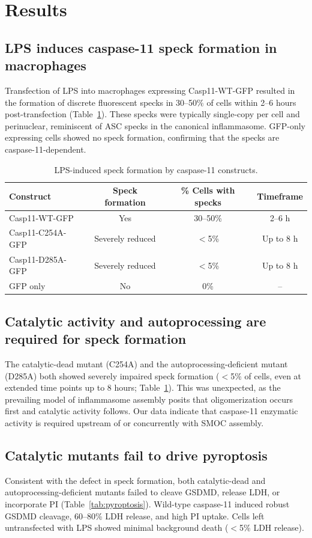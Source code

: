 \documentclass[11pt]{article}
\begin{document}
\section{Results}

\subsection{LPS induces caspase-11 speck formation in macrophages}
Transfection of LPS into macrophages expressing Casp11-WT-GFP resulted in the formation of discrete fluorescent specks in 30--50\% of cells within 2--6 hours post-transfection (Table~\ref{tab:specks}). These specks were typically single-copy per cell and perinuclear, reminiscent of ASC specks in the canonical inflammasome. GFP-only expressing cells showed no speck formation, confirming that the specks are caspase-11-dependent.

\begin{table}[h]
\centering
\caption{LPS-induced speck formation by caspase-11 constructs.}
\label{tab:specks}
\begin{tabular}{lccc}
\toprule
Construct & Speck formation & \% Cells with specks & Timeframe \\
\midrule
Casp11-WT-GFP & Yes & 30--50\% & 2--6 h \\
Casp11-C254A-GFP & Severely reduced & $<$5\% & Up to 8 h \\
Casp11-D285A-GFP & Severely reduced & $<$5\% & Up to 8 h \\
GFP only & No & 0\% & -- \\
\bottomrule
\end{tabular}
\end{table}

\subsection{Catalytic activity and autoprocessing are required for speck formation}
The catalytic-dead mutant (C254A) and the autoprocessing-deficient mutant (D285A) both showed severely impaired speck formation ($<$5\% of cells, even at extended time points up to 8 hours; Table~\ref{tab:specks}). This was unexpected, as the prevailing model of inflammasome assembly posits that oligomerization occurs first and catalytic activity follows. Our data indicate that caspase-11 enzymatic activity is required upstream of or concurrently with SMOC assembly.

\subsection{Catalytic mutants fail to drive pyroptosis}
Consistent with the defect in speck formation, both catalytic-dead and autoprocessing-deficient mutants failed to cleave GSDMD, release LDH, or incorporate PI (Table~\ref{tab:pyroptosis}). Wild-type caspase-11 induced robust GSDMD cleavage, 60--80\% LDH release, and high PI uptake. Cells left untransfected with LPS showed minimal background death ($<$5\% LDH release).
\end{document}
